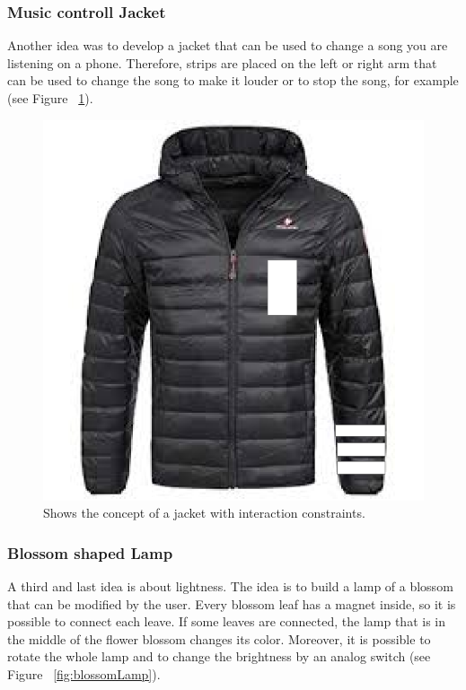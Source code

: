 \documentclass[12pt,twoside,a4paper]{article}
\begin{document}
    \subsubsection{Music controll Jacket}
    \begin{flushleft}
        Another idea was to develop a jacket that can be used to change a song you are listening on a phone. Therefore,
        strips are placed on the left or right arm that can be used to change the song to make it louder or to stop the song, 
        for example (see Figure ~\ref{fig:jacketIdea}).
    \end{flushleft}

    \begin{figure}[h!]
        \centering
        \includegraphics[scale=0.2]{images/projectideas/jacket.png}
        \caption{Shows the concept of a jacket with interaction constraints.}
        \label{fig:jacketIdea}
    \end{figure}

    \subsubsection{Blossom shaped Lamp}
    \label{BlossomShapedLamp}
    \begin{flushleft}
        A third and last idea is about lightness. The idea is to build a lamp of a blossom that can be modified by the user.
        Every blossom leaf has a magnet inside, so it is possible to connect each leave. If some leaves are connected, the lamp that 
        is in the middle of the flower blossom changes its color. Moreover, it is possible to rotate the whole lamp and to change the
        brightness by an analog switch (see Figure ~\ref{fig:blossomLamp}).
    \end{flushleft}
\end{document}
